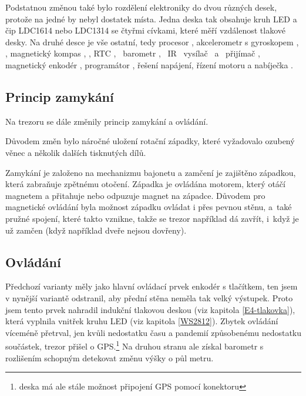 \vspace{-5mm}

Podstatnou změnou také bylo rozdělení elektroniky do dvou různých desek, protože na jedné by nebyl dostatek místa. Jedna deska  
tak obsahuje kruh LED\parencite{WS2812} a čip LDC1614\parencite{LDC1614} nebo LDC1314 se čtyřmi cívkami, které měří vzdálenost tlakové desky. Na druhé desce
je vše ostatní, tedy procesor \parencite{ESP32}, akcelerometr s
gyroskopem \parencite{bmx055}, \parencite{mpu6050}, magnetický kompas \parencite{bmx055}, \parencite{qmc5883}, 
RTC  \parencite{m41t62}, \ barometr \parencite{spl06}, \ IR \ vysílač  \parencite{ir19-21c/tr8} \ a \ přijímač \parencite{irm-h936}, magnetický enkodér \parencite{mh253} \parencite{ss360nt}, programátor \parencite{cp2102},
řešení napájení, řízení motoru a nabíječka \parencite{se9017}. 

\vspace{-4mm}

\subsection{Princip zamykání}

Na trezoru se dále změnily princip zamykání a ovládání. 

Důvodem změn bylo náročné uložení rotační západky, 
které vyžadovalo ozubený věnec a několik dalších tisknutých dílů.

Zamykání je založeno na mechanizmu bajonetu a zamčení je zajištěno západ\-kou, která zabraňuje zpětnému otočení.
Západka je ovládána motorem, který otáčí magnetem a přitahuje nebo odpuzuje magnet na západce. Důvodem pro magnetické ovládání
byla možnost západku ovládat i přes pevnou stěnu, a~také pružné spojení, které takto vznikne, takže se trezor například dá zavřít, i~když
je už zamčen (když například dveře nejsou dovřeny).

\vspace{-4mm}

\subsection{Ovládání}
Předchozí varianty měly jako hlavní ovládací prvek enkodér s tlačítkem, ten jsem v nynější variantě odstranil, aby přední stěna neměla tak velký 
výstupek. Proto jsem tento prvek nahradil indukční tlakovou deskou (viz kapitola \ref{E4-tlakovka}), která vyplnila vnitřek kruhu LED (viz kapitola \ref{WS2812}). 
Zbytek ovládání víceméně přetrval, jen kvůli nedostatku času a pandemií způ\-so\-be\-né\-mu nedostatku součástek, trezor přišel o GPS.\footnote{deska má ale stále možnost připojení GPS pomocí konektoru}
Na druhou stranu ale získal barometr s rozlišením schopným detekovat změnu výšky o půl metru.

